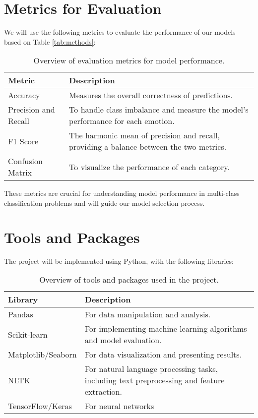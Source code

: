 \documentclass[runningheads]{llncs}
\begin{document}
\newpage

\section{Metrics for Evaluation}
We will use the following metrics to evaluate the performance of our models based on Table \ref{tab:methods}:

\begin{table}[h!]
    \centering
    \begin{tabular}{|l|p{10cm}|}
        \hline
        \textbf{Metric} & \textbf{Description} \\ \hline
        Accuracy & Measures the overall correctness of predictions. \\ \hline	
        Precision and Recall & To handle class imbalance and measure the model’s performance for each emotion. \\ \hline
        F1 Score & The harmonic mean of precision and recall, providing a balance between the two metrics. \\ \hline
        Confusion Matrix &  To visualize the performance of each category. \\ \hline
        
    \end{tabular}
    \caption{Overview of evaluation metrics for model performance.}
    \label{tab:metrics}
\end{table}

These metrics are crucial for understanding model performance in multi-class classification problems 
and will guide our model selection process.

\section{Tools and Packages}
The project will be implemented using Python, with the following libraries:

\begin{table}[h!]
    \centering
    \begin{tabular}{|l|p{10cm}|}
        \hline
        \textbf{Library} & \textbf{Description} \\ \hline
        Pandas & For data manipulation and analysis. \\ \hline
        Scikit-learn & For implementing machine learning algorithms and model evaluation. \\ \hline
        Matplotlib/Seaborn & For data visualization and presenting results. \\ \hline
        NLTK & For natural language processing tasks, including text preprocessing and feature extraction. \\ \hline
        TensorFlow/Keras & For neural networks \\ \hline
    \end{tabular}
    \caption{Overview of tools and packages used in the project.}
    \label{tab:tools}
\end{table}
\end{document}
